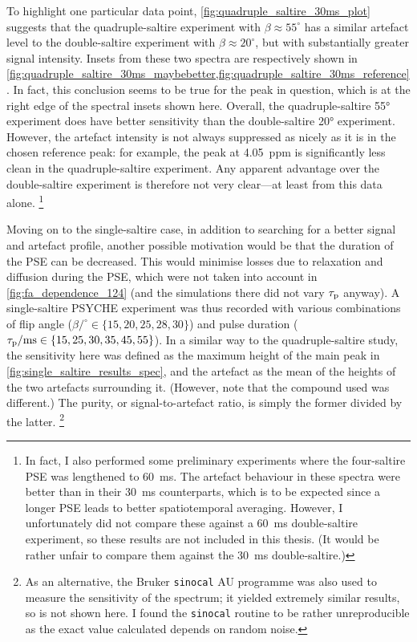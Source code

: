 To highlight one particular data point, \cref{fig:quadruple_saltire_30ms_plot} suggests that the quadruple-saltire experiment with $\beta \approx 55^\circ$ has a similar artefact level to the double-saltire experiment with $\beta \approx 20^\circ$, but with substantially greater signal intensity.
Insets from these two spectra are respectively shown in \cref{fig:quadruple_saltire_30ms_maybebetter,fig:quadruple_saltire_30ms_reference}.
In fact, this conclusion seems to be true for the peak in question, which is at the right edge of the spectral insets shown here.
Overall, the quadruple-saltire \ang{55} experiment does have better sensitivity than the double-saltire \ang{20} experiment.
However, the artefact intensity is not always suppressed as nicely as it is in the chosen reference peak: for example, the peak at \SI{4.05}{ppm} is significantly less clean in the quadruple-saltire experiment.
Any apparent advantage over the double-saltire experiment is therefore not very clear---at least from this data alone.%
\footnote{In fact, I also performed some preliminary experiments where the four-saltire PSE was lengthened to \SI{60}{\ms}. The artefact behaviour in these spectra were better than in their \SI{30}{\ms} counterparts, which is to be expected since a longer PSE leads to better spatiotemporal averaging. However, I unfortunately did not compare these against a \SI{60}{\ms} double-saltire experiment, so these results are not included in this thesis. (It would be rather unfair to compare them against the \SI{30}{\ms} double-saltire.)}

Moving on to the single-saltire case, in addition to searching for a better signal and artefact profile, another possible motivation would be that the duration of the PSE can be decreased.
This would minimise losses due to relaxation and diffusion during the PSE, which were not taken into account in \cref{fig:fa_dependence_124} (and the simulations there did not vary $\tau_\mathrm{p}$ anyway).
A single-saltire PSYCHE experiment was thus recorded with various combinations of flip angle ($\beta/^\circ \in \{15, 20, 25, 28, 30\}$) and pulse duration ($\tau_\mathrm{p}/\text{ms} \in \{15, 25, 30, 35, 45, 55\}$).
In a similar way to the quadruple-saltire study, the sensitivity here was defined as the maximum height of the main peak in \cref{fig:single_saltire_results_spec}, and the artefact as the mean of the heights of the two artefacts surrounding it.
(However, note that the compound used was different.)
The purity, or signal-to-artefact ratio, is simply the former divided by the latter.%
\footnote{As an alternative, the Bruker \texttt{sinocal} AU programme was also used to measure the sensitivity of the spectrum; it yielded extremely similar results, so is not shown here. I found the \texttt{sinocal} routine to be rather unreproducible as the exact value calculated depends on random noise.}


